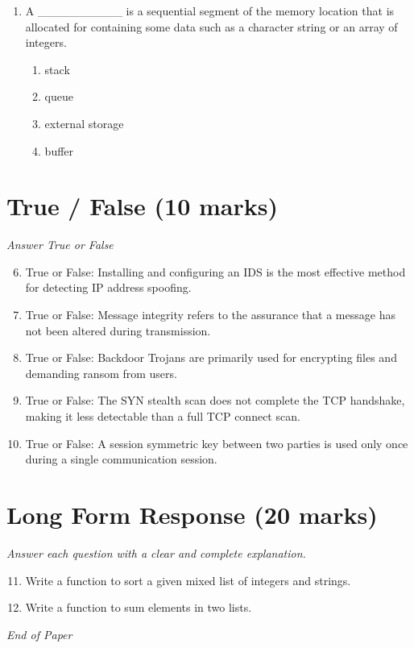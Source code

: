 \documentclass[12pt]{article}
\begin{document}
\begin{enumerate}[label=\arabic*.]
\begin{enumerate}[label=(\alph*)]
    \item Determine who the user is
\end{enumerate}
\item A \_\_\_\_\_\_\_\_\_\_ is a sequential segment of the memory location that is allocated for containing some data such as a character string or an array of integers.
\begin{enumerate}[label=(\alph*)]
    \item stack
    \item queue
    \item external storage
    \item buffer
\end{enumerate}
\end{enumerate}

\section*{True / False (10 marks)}
\textit{Answer True or False}
\begin{enumerate}[label=\arabic*.]
\setcounter{enumi}{5}
\item True or False: Installing and configuring an IDS is the most effective method for detecting IP address spoofing.
\item True or False: Message integrity refers to the assurance that a message has not been altered during transmission.
\item True or False: Backdoor Trojans are primarily used for encrypting files and demanding ransom from users.
\item True or False: The SYN stealth scan does not complete the TCP handshake, making it less detectable than a full TCP connect scan.
\item True or False: A session symmetric key between two parties is used only once during a single communication session.
\end{enumerate}

\section*{Long Form Response (20 marks)}
\textit{Answer each question with a clear and complete explanation.}
\begin{enumerate}[label=\arabic*.]
\setcounter{enumi}{10}
\item Write a function to sort a given mixed list of integers and strings.
\item Write a function to sum elements in two lists.
\end{enumerate}

\vfill
\noindent\textit{End of Paper}
\end{document}
